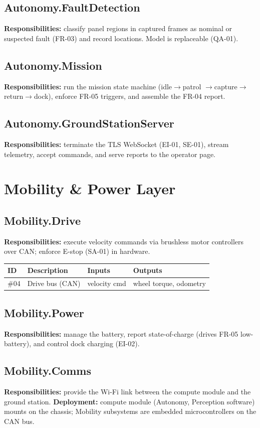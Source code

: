\documentclass[11pt,letterpaper]{article}
\begin{document}
\subsection{Autonomy.FaultDetection}
\textbf{Responsibilities:} classify panel regions in captured frames as nominal or
suspected fault (FR-03) and record locations. Model is replaceable (QA-01).
\subsection{Autonomy.Mission}
\textbf{Responsibilities:} run the mission state machine (idle$\rightarrow$patrol
$\rightarrow$capture$\rightarrow$return$\rightarrow$dock), enforce FR-05 triggers,
and assemble the FR-04 report.
\subsection{Autonomy.GroundStationServer}
\textbf{Responsibilities:} terminate the TLS WebSocket (EI-01, SE-01), stream
telemetry, accept commands, and serve reports to the operator page.

\section{Mobility \& Power Layer}
\subsection{Mobility.Drive}
\textbf{Responsibilities:} execute velocity commands via brushless motor controllers
over CAN; enforce E-stop (SA-01) in hardware.
\begin{table}[H]\begin{center}\begin{tabular}{ | p{1cm} | p{6cm} | p{2.6cm} | p{2.6cm} |}\hline
ID & Description & Inputs & Outputs \\ \hline
\#04 & Drive bus (CAN) & velocity cmd & wheel torque, odometry \\ \hline
\end{tabular}\end{center}\end{table}
\subsection{Mobility.Power}
\textbf{Responsibilities:} manage the battery, report state-of-charge (drives FR-05
low-battery), and control dock charging (EI-02).
\subsection{Mobility.Comms}
\textbf{Responsibilities:} provide the Wi-Fi link between the compute module and the
ground station. \textbf{Deployment:} compute module (Autonomy, Perception software)
mounts on the chassis; Mobility subsystems are embedded microcontrollers on the CAN bus.
\end{document}
